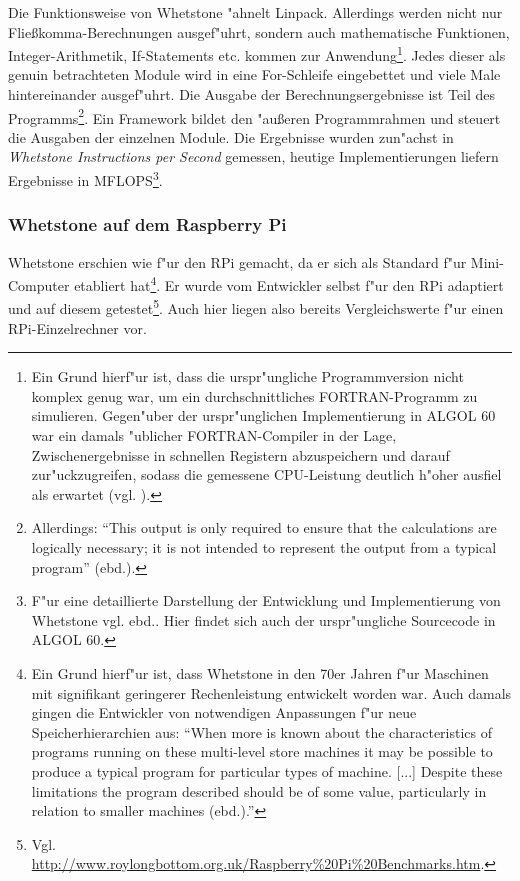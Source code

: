 Die Funktionsweise von Whetstone "ahnelt Linpack. Allerdings werden nicht nur Flie\ss komma-Berechnungen ausgef"uhrt, sondern auch mathematische Funktionen, Integer-Arithmetik, If-Statements etc. kommen zur Anwendung\footnote{Ein Grund hierf"ur ist, dass die urspr"ungliche Programmversion nicht komplex genug war, um ein durchschnittliches FORTRAN-Programm zu simulieren. Gegen"uber der urspr"unglichen Implementierung in ALGOL 60 war ein damals "ublicher FORTRAN-Compiler in der Lage, Zwischenergebnisse in schnellen Registern abzuspeichern und darauf zur"uckzugreifen, sodass die gemessene CPU-Leistung deutlich h"oher ausfiel als erwartet (vgl. \cite{cur76}).}. Jedes dieser als genuin betrachteten Module wird in eine For-Schleife eingebettet und viele Male  hintereinander ausgef"uhrt. Die Ausgabe der Berechnungsergebnisse ist Teil des Programms\footnote{Allerdings: "`This output is only required to ensure that the calculations are logically necessary; it is not intended to represent the output from a typical program"' (ebd.).}. Ein Framework bildet den "au\ss eren Programmrahmen und steuert die Ausgaben der einzelnen Module. Die Ergebnisse wurden zun"achst in \textit{Whetstone Instructions per Second} gemessen, heutige Implementierungen liefern Ergebnisse in MFLOPS\footnote{F"ur eine detaillierte Darstellung der Entwicklung und Implementierung von Whetstone vgl. ebd.. Hier findet sich auch der urspr"ungliche Sourcecode in ALGOL 60.}. 

\subsubsection{Whetstone auf dem Raspberry Pi}\label{Whetstone RPi}

Whetstone erschien wie f"ur den RPi gemacht, da er sich als Standard f"ur Mini-Computer etabliert hat\footnote{Ein Grund hierf"ur ist, dass Whetstone in den 70er Jahren f"ur Maschinen mit signifikant geringerer Rechenleistung entwickelt worden war. Auch damals gingen die Entwickler von notwendigen Anpassungen f"ur neue Speicherhierarchien aus: "`When more is known about the characteristics of programs running on these multi-level store machines it may be possible to produce a typical program for particular types of machine. [...] Despite these limitations the program described should be of some value, particularly in relation to smaller machines (ebd.)."'}. Er wurde vom Entwickler selbst f"ur den RPi adaptiert und auf diesem getestet\footnote{Vgl. \url{http://www.roylongbottom.org.uk/Raspberry\%20Pi\%20Benchmarks.htm}.}. Auch hier liegen also bereits Vergleichswerte f"ur einen RPi-Einzelrechner vor. 

